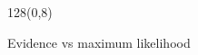 \documentclass[shownotes]{beamer}
\begin{document}
\begin{frame}
\begin{textblock}{128}(0,8)
\begin{center}
 \large Evidence vs maximum likelihood
\end{center}
\end{textblock}
\vspace{0.75cm}



\end{frame}
\end{document}
